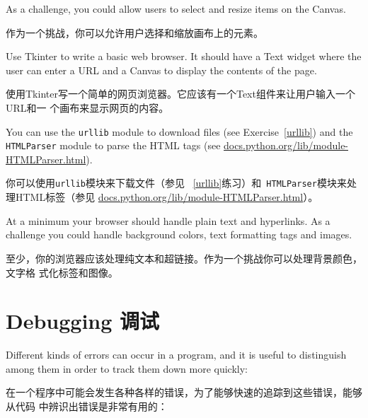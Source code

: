 \documentclass[10pt]{book}
\begin{document}
\begin{CJK}{UTF8}{gbsn}
\begin{exercise}
As a challenge, you could allow users to select and resize
items on the Canvas.

作为一个挑战，你可以允许用户选择和缩放画布上的元素。


\end{exercise}


\begin{exercise}

Use Tkinter to write a basic web browser.  It
should have a Text widget where the user can enter a URL
and a Canvas to display the contents of the page.

使用Tkinter写一个简单的网页浏览器。它应该有一个Text组件来让用户输入一个URL和一
个画布来显示网页的内容。

You can use the {\tt urllib} module to download files
(see Exercise~\ref{urllib}) and
the {\tt HTMLParser} module to parse the HTML
tags (see \url{docs.python.org/lib/module-HTMLParser.html}).

你可以使用{\tt urllib}模块来下载文件（参见 ~\ref{urllib}练习）和{\tt
HTMLParser}模块来处理HTML标签（参见
\url{docs.python.org/lib/module-HTMLParser.html}）。

At a minimum your browser should handle plain text and hyperlinks.  As
a challenge you could handle background colors, text
formatting tags and images.

至少，你的浏览器应该处理纯文本和超链接。作为一个挑战你可以处理背景颜色，文字格
式化标签和图像。


\end{exercise}



\appendix

\chapter{Debugging 调试}


Different kinds of errors can occur
in a program, and it is useful to distinguish among them
in order to track them down more quickly:

在一个程序中可能会发生各种各样的错误，为了能够快速的追踪到这些错误，能够从代码
中辨识出错误是非常有用的：


\end{CJK}
\end{document}
